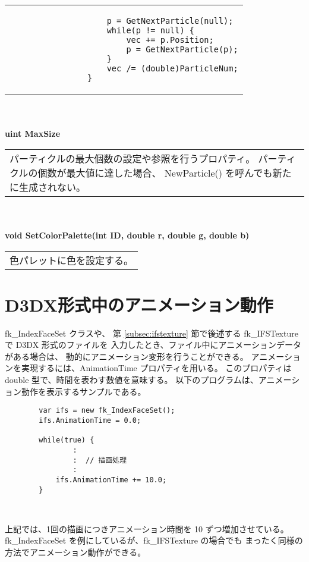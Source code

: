\begin{tabbing}
\begin{tabular}{p{15cm}}
\begin{screen}
\begin{verbatim}
		            p = GetNextParticle(null);
		            while(p != null) {
		                vec += p.Position;
		                p = GetNextParticle(p);
		            }
		            vec /= (double)ParticleNum;
		        }
		\end{verbatim}
		\end{screen}
	\end{tabular} \\ \\

\> \textbf{uint MaxSize} \\
	\> \> \begin{tabular}{p{15cm}}
		パーティクルの最大個数の設定や参照を行うプロパティ。
		パーティクルの個数が最大値に達した場合、
		NewParticle() を呼んでも新たに生成されない。
	\end{tabular} \\ \\

\> \textbf{void SetColorPalette(int ID, double r, double g, double b)} \\
	\> \> \begin{tabular}{p{15cm}}
		色パレットに色を設定する。
	\end{tabular}
\end{tabbing}

\section{D3DX形式中のアニメーション動作} \label{sec:d3dxanimation}
fk\_IndexFaceSet クラスや、
第 \ref{subsec:ifstexture} 節で後述する
fk\_IFSTexture で D3DX 形式のファイルを
入力したとき、ファイル中にアニメーションデータがある場合は、
動的にアニメーション変形を行うことができる。
アニメーションを実現するには、AnimationTime プロパティを用いる。
このプロパティは double 型で、時間を表わす数値を意味する。
以下のプログラムは、アニメーション動作を表示するサンプルである。
\\
\begin{breakbox}
\begin{verbatim}
        var ifs = new fk_IndexFaceSet();
        ifs.AnimationTime = 0.0;
        
        while(true) {
                :
                :  // 描画処理
                :
            ifs.AnimationTime += 10.0;
        }
\end{verbatim}
\end{breakbox} ~

上記では、1回の描画につきアニメーション時間を 10 ずつ増加させている。
fk\_IndexFaceSet を例にしているが、fk\_IFSTexture の場合でも
まったく同様の方法でアニメーション動作ができる。

